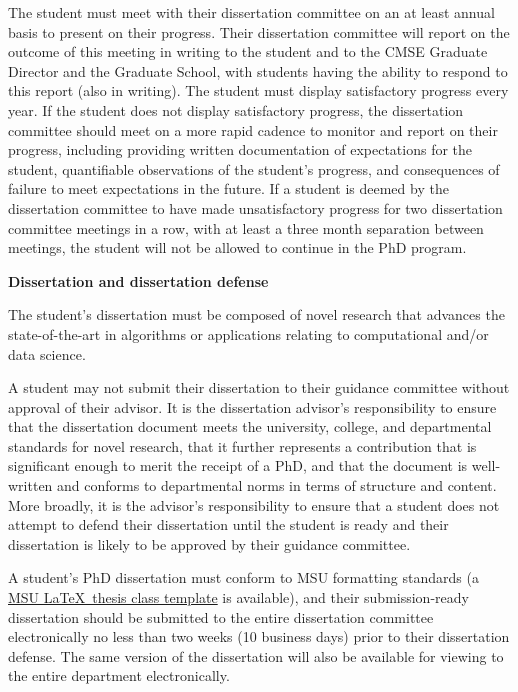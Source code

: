 The student must meet with their dissertation committee on an at least
annual basis to present on their progress.  Their dissertation
committee will report on the outcome of this meeting in writing to the
student and to the CMSE Graduate Director and the Graduate School,
with students having the ability to respond to this report (also in
writing).
The student must display satisfactory progress every year.  If the
student does not display satisfactory progress, the dissertation
committee should meet on a more rapid cadence to monitor and report on
their progress, including providing written documentation of
expectations for the student, quantifiable observations of the
student's progress, and consequences of failure to meet expectations
in the future.  If a student is deemed by the dissertation committee
to have made unsatisfactory progress for two dissertation committee
meetings in a row, with at least a three month separation between
meetings, the student will not be allowed to continue in the PhD
program.

\vspace{3mm}
\noindent
\textbf{Dissertation and dissertation defense}

The student's dissertation must be composed of novel research that
advances the state-of-the-art in algorithms or applications relating
to computational and/or data science.

A student may not submit their dissertation to their guidance
committee without approval of their advisor.  It is the dissertation
advisor's responsibility to ensure that the dissertation document
meets the university, college, and departmental standards for novel
research, that it further represents a contribution that is
significant enough to merit the receipt of a PhD, and that the
document is well-written and  conforms to departmental norms in
terms of structure and content.  More broadly, it is the advisor's
responsibility to ensure that a student does not attempt to defend
their dissertation until the student is ready and  their dissertation
is likely to be approved by their guidance committee.

A student's PhD dissertation must conform to MSU formatting standards
(a \href{http://ctan.org/pkg/msu-thesis}{MSU \LaTeX\ thesis class
  template} is available), and their submission-ready dissertation should be submitted to the entire
dissertation committee electronically no less than two weeks (10 business days) prior to
their dissertation defense.  The same version of the dissertation will also be available for
viewing to the entire department electronically.

